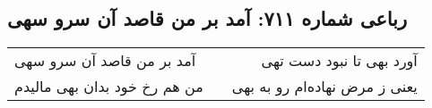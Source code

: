 \begin{center}
\section*{رباعی شماره ۷۱۱: آمد بر من قاصد آن سرو سهی}
\label{sec:sh711}
\begin{longtable}{l p{0.5cm} r}
آمد بر من قاصد آن سرو سهی
&&
آورد بهی تا نبود دست تهی
\\
من هم رخ خود بدان بهی مالیدم
&&
یعنی ز مرض نهاده‌ام رو به بهی
\\
\end{longtable}
\end{center}
